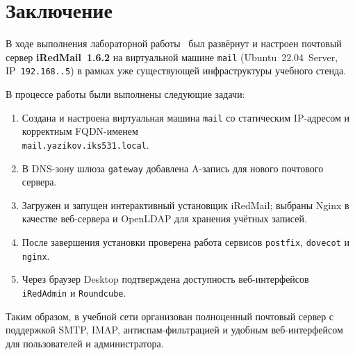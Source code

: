 \chapter*{Заключение}
\label{ch:conclusion}

В ходе выполнения лабораторной работы~\cfgLabNumber{} был развёрнут
и настроен почтовый сервер \textbf{iRedMail~1.6.2} на виртуальной
машине \texttt{mail} (Ubuntu~22.04~Server, IP~\texttt{192.168.\cfgLabStudentN.5})
в рамках уже существующей инфраструктуры учебного стенда.

В процессе работы были выполнены следующие задачи:
\begin{enumerate}
  \item Создана и настроена виртуальная машина \texttt{mail} со статическим
        IP-адресом и корректным FQDN-именем\\
        \texttt{mail.yazikov.iks531.local}.
  \item В DNS-зону шлюза \texttt{gateway} добавлена A-запись для
        нового почтового сервера.
  \item Загружен и запущен интерактивный установщик iRedMail;
        выбраны Nginx в качестве веб-сервера и OpenLDAP
        для хранения учётных записей.
  \item После завершения установки проверена работа сервисов
        \texttt{postfix}, \texttt{dovecot} и \texttt{nginx}.
  \item Через браузер Desktop подтверждена доступность веб-интерфейсов
        \texttt{iRedAdmin} и \texttt{Roundcube}.
\end{enumerate}

Таким образом, в учебной сети организован полноценный почтовый сервер
с поддержкой SMTP, IMAP, антиспам-фильтрацией и удобным
веб-интерфейсом для пользователей и администратора.

\endinput
